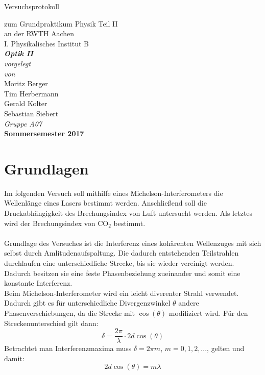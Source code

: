 \documentclass[12pt,a4paper]{article}
\author{Tim}
\begin{document}
\setlength{\parindent}{0pt} 
\begin{center}
{\LARGE Versuchsprotokoll}\\
\begin{large}
zum Grundpraktikum Physik Teil II\\[0.4cm]
an der RWTH Aachen\\
I. Physikalisches Institut B\\[4.5cm]
\Large\textbf{\textsl{Optik II}}\\[4cm]
\normalsize\textit{vorgelegt\\von}\\[0.4cm]
\large{Moritz Berger\\Tim Herbermann\\Gerald Kolter\\Sebastian Siebert}\\[1cm]
\large \textit{Gruppe A07} \\ [3cm]
\large \textbf{Sommersemester 2017}
\end{large}
\end{center}
\newpage

\tableofcontents
\newpage

\section{Grundlagen}

Im folgenden Versuch soll mithilfe eines Michelson-Interferometers die Wellenlänge eines Lasers bestimmt werden. Anschließend soll die Druckabhängigkeit des Brechungsindex von Luft untersucht werden. Als letztes wird der Brechungsindex von $\text{CO}_2$ bestimmt.\\
\\
Grundlage des Versuches ist  die Interferenz eines kohärenten Wellenzuges mit sich selbst durch Amlitudenaufspaltung. Die dadurch entstehenden Teilstrahlen durchlaufen eine unterschiedliche Strecke, bis sie wieder vereinigt werden. Dadurch besitzen sie eine feste Phasenbeziehung zueinander und somit eine konstante Interferenz.\\
Beim Michelson-Interferometer wird ein leicht diverenter Strahl verwendet. Dadurch gibt es für unterschiedliche Divergenzwinkel $\theta$ andere Phasenverschiebungen, da die Strecke mit $\cos(\theta)$ modifiziert wird. Für den Streckenunterschied gilt dann:
\begin{equation}
\delta = \dfrac{2\pi}{\lambda} \cdot 2d \cos(\theta)
\end{equation}
Betrachtet man Interferenzmaxima muss $\delta = 2\pi m$, $m=0,1,2,...$, gelten und damit:
\begin{equation}
2d \cos(\theta) = m\lambda
\end{equation}
\end{document}
